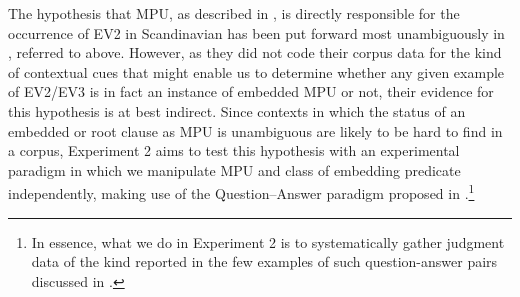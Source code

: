 \documentclass[output=paper]{LSP/langsci}
\begin{document}
%
%

The hypothesis that MPU, as described in \cite{simons07}, is directly responsible for the occurrence of EV2 in Scandinavian has been put forward most unambiguously in \cite{jensen-christensen13}, referred to above. However, as they did not code their corpus data for the kind of contextual cues that might enable us to determine whether any given example of EV2/EV3 is in fact an instance of embedded MPU or not, their evidence for this hypothesis is at best indirect. Since contexts in which the status of an embedded or root clause as MPU is unambiguous are likely to be hard to find in a corpus, Experiment 2 aims to test this hypothesis with an experimental paradigm in which we manipulate MPU and class of embedding predicate independently, making use of the Question--Answer paradigm proposed in \cite{simons07}.\footnote{In essence, what we do in Experiment 2 is to systematically gather judgment data of the kind reported in the few examples of such question-answer pairs discussed in \cite{wiklund-etal09}. } 
\end{document}
